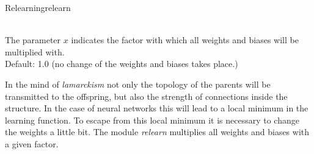 \begin{moduledoc}{Relearning}{relearn}

\item[\KeyWord{relearnfactor} \optParam{f}]~\\
The parameter $x$ indicates the factor with which all weights and biases will
be multiplied with. \\
Default: 1.0 (no change of the weights and biases takes place.)


\end{moduledoc}
In the mind of {\it lamarckism} not only the topology of the parents will 
be transmitted to the offspring, but also the strength of connections inside the 
structure.
In the case of neural networks this will lead to a local minimum in the learning
function. To escape from this local minimum it is necessary to change the weights a little
bit. The module {\it relearn} multiplies  all weights and biases with a given factor.









